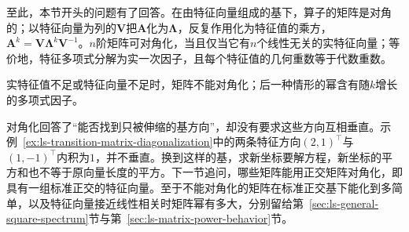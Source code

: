 至此，本节开头的问题有了回答。在由特征向量组成的基下，算子的矩阵是对角的；以特征向量为列的$\bm V$把$\bm A$化为$\bm\Lambda$，反复作用化为特征值的乘方，$\bm A^k=\bm V\bm\Lambda^k\bm V^{-1}$。$n$阶矩阵可对角化，当且仅当它有$n$个线性无关的实特征向量；等价地，特征多项式分解为实一次因子，且每个特征值的几何重数等于代数重数。

实特征值不足或特征向量不足时，矩阵不能对角化；后一种情形的幂含有随$k$增长的多项式因子。

对角化回答了“能否找到只被伸缩的基方向”，却没有要求这些方向互相垂直。示例~\ref{ex:ls-transition-matrix-diagonalization}中的两条特征方向$(2,1)^{\top}$与$(1,-1)^{\top}$内积为$1$，并不垂直。换到这样的基，求新坐标要解方程，新坐标的平方和也不等于原向量长度的平方。下一节追问，哪些矩阵能用正交矩阵对角化，即具有一组标准正交的特征向量。至于不能对角化的矩阵在标准正交基下能化到多简单，以及特征向量接近线性相关时矩阵幂有多大，分别留给第~\ref{sec:ls-general-square-spectrum}节与第~\ref{sec:ls-matrix-power-behavior}节。
